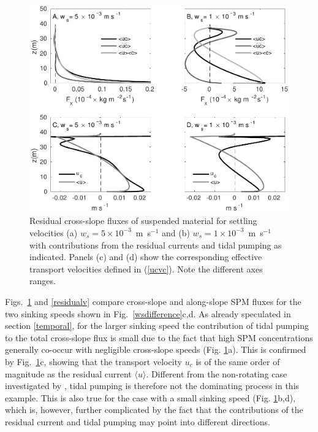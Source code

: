 \begin{figure}
  \noindent\includegraphics[width=40pc]{restrans.pdf}
  \caption{Residual cross-slope fluxes of suspended material for
    settling velocities (a) $w_s = 5 \times 10^{-3}$~m~s$^{-1}$ and
    (b) $w_s = 1 \times 10^{-3}$~m~s$^{-1}$ with contributions from
    the residual currents and tidal pumping as indicated. Panels (c)
    and (d) show the corresponding effective transport velocities
    defined in (\ref{ucvc}). Note the different axes ranges. }
  \label{residualu}
  
\end{figure}
Figs.\ \ref{residualu} and \ref{residualv} compare cross-slope and
along-slope SPM fluxes for the two sinking speeds shown in
Fig.\ \ref{wsdifference}c,d. As already speculated in section
\ref{temporal}, for the larger sinking speed the contribution of tidal
pumping to the total cross-slope flux is small due to the fact that
high SPM concentrations generally co-occur with negligible cross-slope
speeds (Fig. \ref{residualu}a). This is confirmed by
Fig.\ \ref{residualu}c, showing that the transport velocity $u_c$ is
of the same order of magnitude as the residual current $\langle u
\rangle$. Different from the non-rotating case investigated by
\cite{schulzumlauf2016}, tidal pumping is therefore not the
dominating process in this example. This is also true for the case
with a small sinking speed (Fig. \ref{residualu}b,d), which is,
however, further complicated by the fact that the contributions of the
residual current and tidal pumping may point into different
directions.

